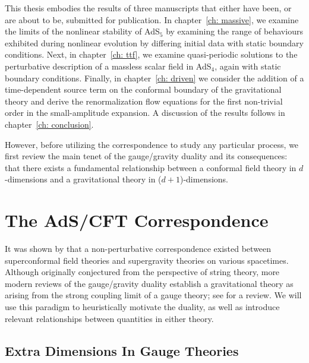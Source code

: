 \documentclass[../PhD.tex]{subfiles}
\begin{document}
This thesis embodies the results of three manuscripts that either have been, or are about to be, submitted for publication. In chapter~\ref{ch: massive}, we examine the limits of the nonlinear stability of AdS$_5$ by examining the range of behaviours exhibited during nonlinear evolution by differing initial data with static boundary conditions. Next, in chapter~\ref{ch: ttf}, we examine quasi-periodic solutions to the perturbative description of a massless scalar field in AdS$_4$, again with static boundary conditions. Finally, in chapter~\ref{ch: driven} we consider the addition of a time-dependent source term on the conformal boundary of the gravitational theory and derive the renormalization flow equations for the first non-trivial order in the small-amplitude expansion. A discussion of the results follows in chapter~\ref{ch: conclusion}.

However, before utilizing the correspondence to study any particular process, we first review the main tenet of the gauge/gravity duality and its consequences: that there exists a fundamental relationship between a conformal field theory in $d$-dimensions and a gravitational theory in ($d + 1$)-dimensions.


\section{The AdS/CFT Correspondence}
\label{sec: ads/cft}

It was shown by \cite{hep-th/9711200} that a non-perturbative correspondence existed between superconformal field theories and supergravity theories on various spacetimes. Although originally conjectured from the perspective of string theory, more modern reviews of the gauge/gravity duality establish a gravitational theory as arising from the strong coupling limit of a gauge theory; see \cite{gr-qc/0602037} for a review. We will use this paradigm to heuristically motivate the duality, as well as introduce relevant relationships between quantities in either theory.  


\subsection{Extra Dimensions In Gauge Theories}
\label{ssec: extra dims in gauge theories}
\end{document}
